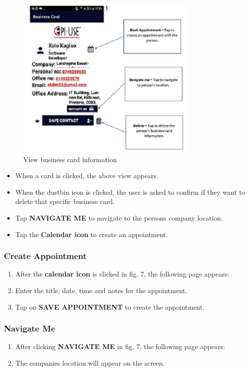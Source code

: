 \documentclass[english]{article}
\begin{document}
		\begin{figure}[H]
			\centering
			\includegraphics[scale=0.5]{person_info.png}
			\caption{View business card information}
			\label{figure: 7}
		\end{figure}
		\begin{itemize}
			\item When a card is clicked, the above view appears.
			\item When the dustbin icon is clicked, the user is asked to confirm if they want to delete that specific business card.
			\item Tap \textbf{NAVIGATE ME} to navigate to the persons company location.
			\item Tap the \textbf{Calendar icon} to create an appointment. 
		\end{itemize}
	\subsubsection{Create Appointment}
		\begin{enumerate}
			\item After the \textbf{calendar icon} is clicked in fig. 7, the following page appears:
			
			\item Enter the title, date, time and notes for the appointment.
			\item Tap on \textbf{SAVE APPOINTMENT} to create the appointment.
		\end{enumerate}
		
	\subsubsection{Navigate Me}
		\begin{enumerate}
			\item After clicking \textbf{NAVIGATE ME} in fig. 7, the following page appears:
			
			\item The companies location will appear on the screen.
		\end{enumerate}
\end{document}
